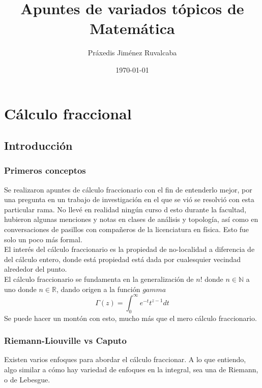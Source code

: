 \documentclass[11pt,a4paper,oneside]{report}
\title{Apuntes de variados tópicos de Matemática}
\author{Práxedis Jiménez Ruvalcaba}
\date{\today}
\theoremstyle{definition}
\theoremstyle{plain}
\theoremstyle{remark}
\newcommand{\N}{\mathbb{N}}
\newcommand{\R}{\mathbb{R}}
\begin{document}
\maketitle
\tableofcontents

\part{Cálculo fraccional}

\chapter{Introducción}

\section{Primeros conceptos}

Se realizaron apuntes de cálculo fraccionario con el fin de entenderlo mejor, por 
una pregunta en un trabajo de investigación en el que se vió se resolvió con esta particular rama.
No llevé en realidad ningún curso d esto durante la facultad, hubieron algunas menciones y notas
en clases de análisis y topología, así como en conversaciones de pasillos con compañeros de la licenciatura
en física. Esto fue solo un poco más formal.\\
El interés del cálculo fraccionario es la propiedad de no-localidad a diferencia de del cálculo entero,
donde está propiedad está dada por cualesquier vecindad alrededor del punto. \\
El cálculo fraccionario se fundamenta en la generalización de $n!$ donde $n\in \N$ a uno donde $n\in\R$,
dando origen a la función $gamma$
\[\Gamma(z)=\int_{0}^{\infty} e^{-t}t^{z-1}dt \] 
Se puede hacer un montón con esto, mucho más que el mero cálculo fraccionario.\\

\section{Riemann-Liouville vs Caputo}
Existen varios enfoques para abordar el cálculo fraccionar. A lo que entiendo, algo similar a cómo hay variedad de enfoques
en la integral, sea una de Riemann, o de Lebesgue.\\
\end{document}
